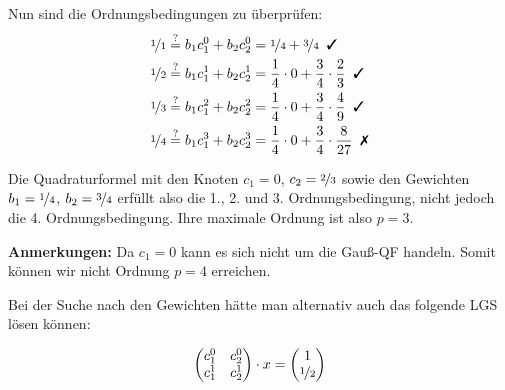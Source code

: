 Nun sind die Ordnungsbedingungen zu überprüfen:
\begin{align}
    \nicefrac{1}{1} &\stackrel{?}{=} b_1 c_1^0 + b_2 c_2^0 = \nicefrac{1}{4} + \nicefrac{3}{4} \text{\;\;\cmark}\\
    \nicefrac{1}{2} &\stackrel{?}{=} b_1 c_1^1 + b_2 c_2^1 = \frac{1}{4} \cdot 0 + \frac{3}{4} \cdot \frac{2}{3} \text{\;\;\cmark}\\
    \nicefrac{1}{3} &\stackrel{?}{=} b_1 c_1^2 + b_2 c_2^2 = \frac{1}{4} \cdot 0 + \frac{3}{4} \cdot \frac{4}{9} \text{\;\;\cmark}\\
    \nicefrac{1}{4} &\stackrel{?}{=} b_1 c_1^3 + b_2 c_2^3 = \frac{1}{4} \cdot 0 + \frac{3}{4} \cdot \frac{8}{27} \text{\;\;\xmark}\\
\end{align}

Die Quadraturformel mit den Knoten $c_1 = 0$, $c_2 = \nicefrac{2}{3}$ sowie
den Gewichten $b_1 = \nicefrac{1}{4}$, $b_2 = \nicefrac{3}{4}$ erfüllt
also die 1., 2. und 3. Ordnungsbedingung, nicht jedoch die 4.
Ordnungsbedingung. Ihre maximale Ordnung ist also $p=3$.

\textbf{Anmerkungen:} Da $c_1 = 0$ kann es sich nicht um die Gauß-QF handeln.
Somit können wir nicht Ordnung $p=4$ erreichen.

Bei der Suche nach den Gewichten hätte man alternativ auch das folgende
LGS lösen können:

\begin{align}
    \begin{pmatrix}
        c_1^0 & c_2^0\\
        c_1^1 & c_2^1
    \end{pmatrix}
    \cdot x
    =
    \begin{pmatrix}
        1\\
        \nicefrac{1}{2}
    \end{pmatrix}
\end{align}
